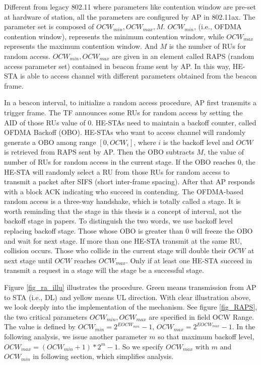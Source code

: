 Different from legacy 802.11 where parameters like contention window are pre-set at hardware of station, all the parameters are configured by AP in 802.11ax. 
The parameter set is composed of $OCW_{min}, OCW_{max}, M$. $OCW_{min}$, (i.e., OFDMA contention window), represents the minimum contention window, while $OCW_{max}$ represents the maximum contention window. 
And $M$ is the number of RUs for random access. $OCW_{min}, OCW_{max}$ are given in an element called RAPS (random access parameter set) contained in beacon frame sent by AP.
In this way, HE-STA is able to access channel with different parameters obtained from the beacon frame. 


In a beacon interval, to initialize a random access procedure, AP first transmits a trigger frame. 
The TF announces some RUs for random access by setting the AID of those RUs value of 0. 
HE-STAs need to maintain a backoff counter, called OFDMA Backoff (OBO). 
HE-STAs who want to access channel will randomly generate a OBO among range $[0, OCW_i]$, where $i$ is the backoff level and $OCW$ is retrieved from RAPS sent by AP. 
Then the OBO subtracts $M$, the value of number of RUs for random access in the current stage. 
If the OBO reaches 0, the HE-STA will randomly select a RU from those RUs for random access to transmit a packet after SIFS (short inter-frame spacing). 
After that AP responds with a block ACK indicating who succeed in contending.
The OFDMA-based random access is a three-way handshake, which is totally called a stage. 
It is worth reminding that the stage in this thesis is a concept of interval\cite{draft_ax}, not the backoff stage in papers\cite{bianchi2000performance}. 
To distinguish the two words, we use backoff level replacing backoff stage. 
Those whose OBO is greater than 0 will freeze the OBO and wait for next stage.  
If more than one HE-STA transmit at the same RU, collision occurs. 
Those who collide in the current stage will double their $OCW$ at next stage until $OCW$ reaches $OCW_{max}$. 
Only if at least one HE-STA succeed in transmit a request in a stage will the stage be a successful stage. 

Figure \ref{fig_ra_illu} illustrates the procedure. Green means transmission from AP to STA (i.e., DL) and yellow means UL direction. 
With clear illustration above, we look deeply into the implementation of the mechanism.
See figure \ref{fig_RAPS}, the two critical parameters $OCW_{min},OCW_{max}$ are specified in field OCW Range. 
The value is defined by $OCW_{min} = 2^{EOCW_{min}}-1$, $OCW_{max} = 2^{EOCW_{max}}-1$. 
In the following analysis, we issue another parameter $m$ so that maximum backoff level, $OCW_{max} = (OCW_{min}+1)*2^m-1$. So we specify $OCW_{max}$ with $m$ and $OCW_{min}$ in following section, which simplifies analysis.


